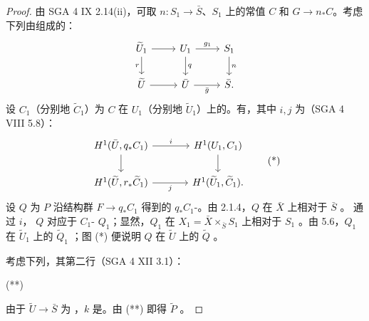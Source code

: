 \begin{proof}
由 SGA 4 IX 2.14(ii)，可取 $n:S_1\to\bar S$、$S_1$ 上的常值 $C$ 和 $G\to n_*C$。考虑下列由组成的：
\[
\begin{tikzcd}
\widetilde U_1\arrow[r]\arrow[d,"r"']&U_1\arrow[r,"g_1"]\arrow[d,"q"]&S_1\arrow[d,"n"]\\
\widetilde U\arrow[r]&\bar U\arrow[r,"\bar g"']&\bar S.
\end{tikzcd}
\]
设 $C_1$（分别地 $\widetilde C_1$）为 $C$ 在 $U_1$（分别地 $\widetilde U_1$）上的。有，其中 $i,j$ 为（SGA 4 VIII 5.8）：
\[
\begin{tikzcd}[column sep=large]
H^1(\bar U,q_*C_1)\arrow[r,"i"]\arrow[d]&H^1(U_1,C_1)\arrow[d]\\
H^1(\widetilde U,r_*\widetilde C_1)\arrow[r,"j"']&H^1(\widetilde U_1,\widetilde C_1).
\end{tikzcd}\tag{*}
\]
设 $Q$ 为 $P$ 沿结构群 $F\to q_*C_1$ 得到的 $q_*C_1$-。由 2.1.4，$Q$ 在 $\bar X$ 上相对于 $\bar S$ 。
通过 $i$， $Q$ 对应于 $C_1$- $Q_1$；显然，$Q_1$ 在 $X_1=\bar X\times_{\bar S}S_1$ 上相对于 $S_1$ 。由 5.6，$Q_1$ 在 $\widetilde U_1$ 上的 $\widetilde Q_1$ ；图 (*) 便说明 $Q$ 在 $\widetilde U$ 上的 $\widetilde Q$ 。

考虑下列，其第二行（SGA 4 XII 3.1）：
\begin{center}
\quad(**)
\end{center}
由于 $\widetilde U\to\bar S$ 为 ，$k$ 是。由 (**) 即得 $\widetilde P$ 。
\end{proof}

